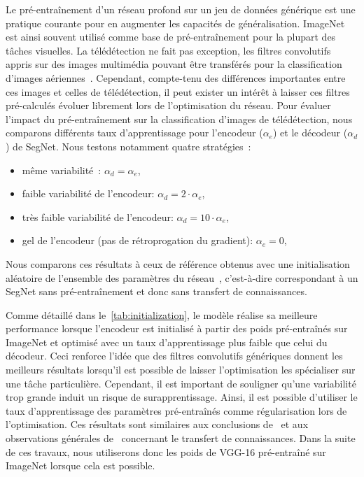 Le pré-entraînement d'un réseau profond sur un jeu de données générique est une pratique courante pour en augmenter les capacités de généralisation. ImageNet est ainsi souvent utilisé comme base de pré-entraînement pour la plupart des tâches visuelles. La télédétection ne fait pas exception, les filtres convolutifs appris sur des images multimédia pouvant être transférés pour la classification d'images aériennes~\cite{penatti_deep_2015}. Cependant, compte-tenu des différences importantes entre ces images et celles de télédétection, il peut exister un intérêt à laisser ces filtres pré-calculés évoluer librement lors de l'optimisation du réseau. Pour évaluer l'impact du pré-entraînement sur la classification d'images de télédétection, nous comparons différents taux d'apprentissage pour l'encodeur ($\alpha_{e}$) et le décodeur ($\alpha_{d}$) de SegNet. Nous testons notamment quatre stratégies~:
\begin{itemize}
  \item même variabilité~: $\alpha_{d} = \alpha_{e}$, %
  \item faible variabilité de l'encodeur: $\alpha_{d} = 2 \cdot \alpha_{e}$, %
  \item très faible variabilité de l'encodeur: $\alpha_{d} = 10 \cdot \alpha_{e}$, %
  \item gel de l'encodeur (pas de rétroprogation du gradient): $\alpha_{e} = 0$, %
\end{itemize}

Nous comparons ces résultats à ceux de référence obtenus avec une initialisation aléatoire de l'ensemble des paramètres du réseau~\cite{he_delving_2015}, c'est-à-dire correspondant à un SegNet sans pré-entraînement et donc sans transfert de connaissances.

Comme détaillé dans le~\cref{tab:initialization}, le modèle réalise sa meilleure performance lorsque l'encodeur est initialisé à partir des poids pré-entraînés sur ImageNet et optimisé avec un taux d'apprentissage plus faible que celui du décodeur. Ceci renforce l'idée que des filtres convolutifs génériques donnent les meilleurs résultats lorsqu'il est possible de laisser l'optimisation les spécialiser sur une tâche particulière. Cependant, il est important de souligner qu'une variabilité trop grande induit un risque de surapprentissage. Ainsi, il est possible d'utiliser le taux d'apprentissage des paramètres pré-entraînés comme régularisation lors de l'optimisation. Ces résultats sont similaires aux conclusions de~\cite{nogueira_towards_2016} et aux observations générales de~\cite{yosinski_how_2014} concernant le transfert de connaissances. Dans la suite de ces travaux, nous utiliserons donc les poids de VGG-16 pré-entraîné sur ImageNet lorsque cela est possible.

